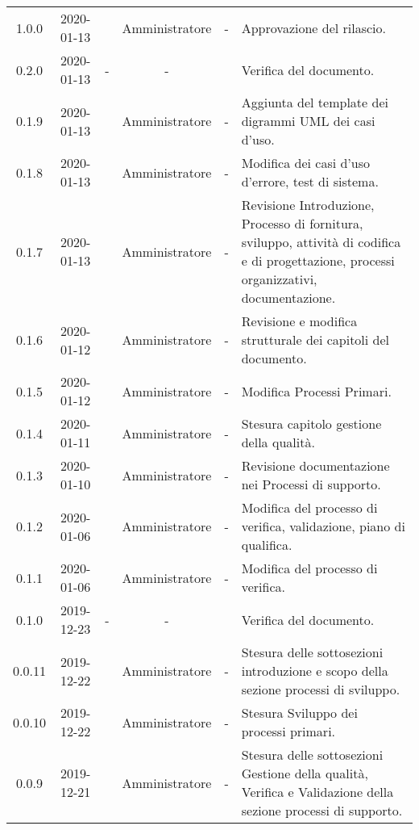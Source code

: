 {\begin{longtable}{ c c  C{2.5cm} c C{3cm} C{3.5cm}}
1.0.0 & 2020-01-13 & \AT{} & Amministratore & - & Approvazione del  rilascio.  \\

0.2.0 & 2020-01-13 & - & - & \PF{} & Verifica del documento.  \\ 

0.1.9 & 2020-01-13 & \CE{} & Amministratore & - & Aggiunta del template dei digrammi UML dei casi d'uso. \\

0.1.8 & 2020-01-13 & \BR{} & Amministratore & - & Modifica dei casi d'uso d'errore, test di sistema. \\

0.1.7 & 2020-01-13 & \AT{} & Amministratore & - & Revisione Introduzione, Processo di fornitura, sviluppo, attività di codifica e di progettazione, processi organizzativi, documentazione. \\

0.1.6 & 2020-01-12 & \MC{} & Amministratore & - & Revisione e modifica strutturale dei capitoli del documento. \\

0.1.5 & 2020-01-12 & \AT{} & Amministratore & - & Modifica Processi Primari. \\

0.1.4 & 2020-01-11 & \MC{} & Amministratore & - & Stesura capitolo gestione della qualità. \\

0.1.3 & 2020-01-10 & \MC{} & Amministratore & - & Revisione documentazione nei Processi di supporto. \\

0.1.2 & 2020-01-06 & \AT{} & Amministratore & - & Modifica del processo di verifica, validazione, piano di qualifica. \\

0.1.1 & 2020-01-06 & \AT{} & Amministratore & - & Modifica del processo di verifica. \\

0.1.0 & 2019-12-23 & - & - & \CE{} & Verifica del documento. \\

0.0.11 & 2019-12-22 & \PF{} & Amministratore & - & Stesura delle sottosezioni introduzione e scopo della sezione processi di sviluppo. \\

0.0.10 & 2019-12-22 & \PF{} & Amministratore & - & Stesura Sviluppo dei processi primari. \\

0.0.9 & 2019-12-21 & \PF{} & Amministratore & - & Stesura delle sottosezioni Gestione della qualità, Verifica e Validazione della sezione processi di supporto. \\


\end{longtable}}
